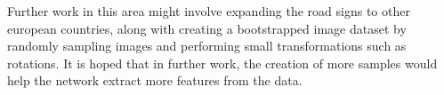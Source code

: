 \documentclass[a4paper,11pt]{article}
\begin{document}
Further work in this area might involve expanding the road signs to other european countries, along with creating a bootstrapped image dataset by randomly sampling images and performing small transformations such as rotations. It is hoped that in further work, the creation of more samples would help the network extract more features from the data.



\typeout{}

\end{document}
